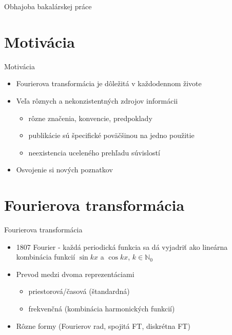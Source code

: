 \documentclass{beamer}
\date{\today}
\title\mytitle
\author\myauthor
\begin{document}
\begin{frame}{Obhajoba bakalárskej práce}
    \titlepage
\end{frame}


\section{Motivácia}
\begin{frame}{Motivácia}
    \begin{itemize}
        \item Fourierova transformácia je dôležitá v každodennom
              živote
        \item Veľa rôznych a nekonzistentných zdrojov informácii
            \begin{itemize}
                \item rôzne značenia, konvencie, predpoklady
                \item publikácie sú špecifické poväčšinou na jedno použitie
                \item neexistencia uceleného prehľadu súvislostí
            \end{itemize}
        \item Osvojenie si nových poznatkov
    \end{itemize}
\end{frame}

\section{Fourierova transformácia}
\begin{frame}{Fourierova transformácia}
    \begin{itemize}
        \item 1807 Fourier - každá periodická funkcia sa dá vyjadriť
        ako lineárna kombinácia funkcií $\sin kx$ a $\cos kx$,
        $k \in \mathbb{N}_0$
        \item Prevod medzi dvoma reprezentáciami
            \begin{itemize}
                \item priestorová/časová (štandardná)
                \item frekvenčná (kombinácia harmonických funkcií)
            \end{itemize}
        \item Rôzne formy (Fourierov rad, spojitá FT, diskrétna FT)
    \end{itemize}
\end{frame}
\end{document}
